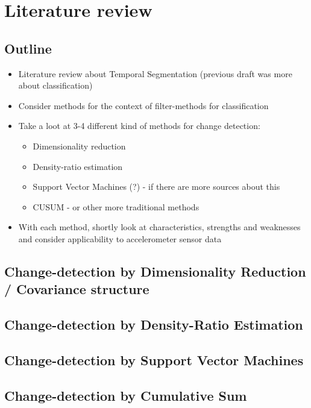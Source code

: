 
\chapter{Literature review}

\label{Chapter2} %


\section{Outline}
\begin{itemize}
  \item Literature review about Temporal Segmentation (previous draft was more about classification)
  \item Consider methods for the context of filter-methods for classification
  \item Take a loot at 3-4 different kind of methods for change detection:
    \begin{itemize}
      \item Dimensionality reduction
      \item Density-ratio estimation
      \item Support Vector Machines (?) - if there are more sources about this
      \item CUSUM - or other more traditional methods
    \end{itemize}
  \item With each method, shortly look at characteristics, strengths and weaknesses and consider applicability to accelerometer sensor data
\end{itemize}


\section{Change-detection by Dimensionality Reduction / Covariance structure}


\section{Change-detection by Density-Ratio Estimation}

\section{Change-detection by Support Vector Machines}

\section{Change-detection by Cumulative Sum}

